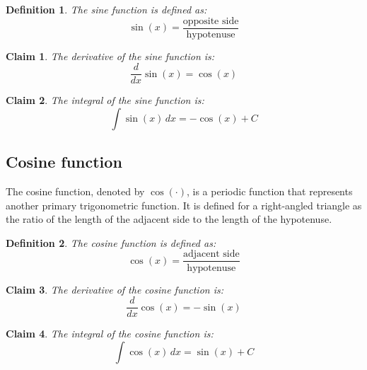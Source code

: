 \documentclass[11pt]{book} %
\newtheorem{definition}{Definition}[section]
\newtheorem*{claim*}{Claim}
\begin{document}
\begin{definition}
    The sine function is defined as:
    \begin{equation}
        \sin(x) = \frac{\text{opposite side}}{\text{hypotenuse}}
    \end{equation}
\end{definition}

\begin{claim*}
    The derivative of the sine function is:
    \begin{equation}
        \frac{d}{dx} \sin(x) = \cos(x)
    \end{equation}
\end{claim*}

\begin{claim*}
    The integral of the sine function is:
    \begin{equation}
        \int \sin(x) \, dx = -\cos(x) + C
    \end{equation}
\end{claim*}


\subsection{Cosine function}
The cosine function, denoted by \(\cos(\cdot)\), is a periodic function that represents another primary trigonometric function.
It is defined for a right-angled triangle as the ratio of the length of the adjacent side to the length of the hypotenuse.

\begin{definition}
    The cosine function is defined as:
    \begin{equation}
        \cos(x) = \frac{\text{adjacent side}}{\text{hypotenuse}}
    \end{equation}
\end{definition}

\begin{claim*}
    The derivative of the cosine function is:
    \begin{equation}
        \frac{d}{dx} \cos(x) = -\sin(x)
    \end{equation}
\end{claim*}

\begin{claim*}
    The integral of the cosine function is:
    \begin{equation}
        \int \cos(x) \, dx = \sin(x) + C
    \end{equation}
\end{claim*}
\end{document}
